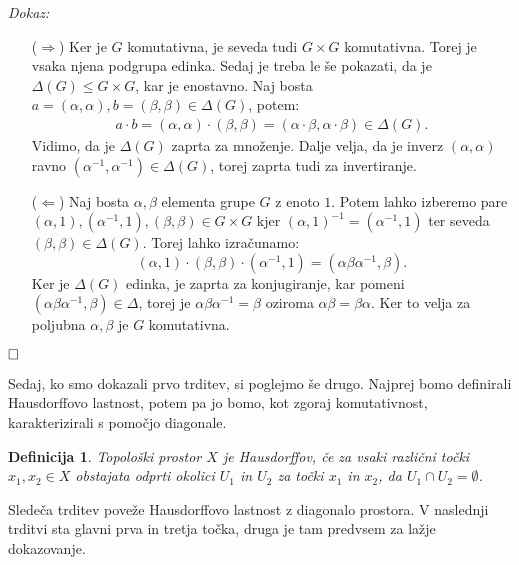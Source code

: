 \documentclass[a4paper,12pt]{article}
\def\qed{$\hfill\Box$}   %
\newtheorem{definicija}{Definicija}
\begin{document}
\noindent
{\em Dokaz:\/}
    \begin{itemize}
        \item[($\Rightarrow$)] Ker je $G$ komutativna, je seveda tudi $G \times G$ komutativna. Torej je vsaka njena podgrupa edinka.
            Sedaj je treba le še pokazati, da je $\Delta(G) \le G \times G$, kar je enostavno. Naj bosta $a = (\alpha, \alpha), b = (\beta, \beta) \in \Delta(G)$, potem:
            \begin{gather*}
                a \cdot b = (\alpha, \alpha) \cdot (\beta, \beta) = (\alpha \cdot \beta, \alpha \cdot \beta) \in \Delta(G).
            \end{gather*}
            Vidimo, da je $\Delta(G)$ zaprta za množenje. Dalje velja, da je inverz $(\alpha, \alpha)$ ravno $(\alpha^{-1}, \alpha^{-1}) \in \Delta(G)$, torej zaprta tudi za invertiranje.
        \item[($\Leftarrow$)] Naj bosta $\alpha, \beta$ elementa grupe $G$ z enoto $1$.
            Potem lahko izberemo pare $(\alpha,1), (\alpha^{-1}, 1), (\beta, \beta) \in G \times G$ kjer
            $(\alpha,1)^{-1} = (\alpha^{-1},1)$ ter seveda $(\beta, \beta) \in \Delta(G)$. Torej lahko izračunamo:
            \[(\alpha,1) \cdot (\beta, \beta) \cdot (\alpha^{-1}, 1) = (\alpha\beta\alpha^{-1}, \beta).\]
            Ker je $\Delta(G)$ edinka, je zaprta za konjugiranje, kar pomeni $(\alpha\beta\alpha^{-1}, \beta) \in \Delta$,
            torej je $\alpha\beta\alpha^{-1} = \beta$ oziroma $\alpha\beta = \beta\alpha$. Ker to velja za poljubna $\alpha, \beta$ je $G$ komutativna.
    \end{itemize}
\qed


Sedaj, ko smo dokazali prvo trditev, si poglejmo še drugo. Najprej bomo definirali Hausdorffovo lastnost, potem pa jo bomo, kot zgoraj komutativnost, karakterizirali s pomočjo diagonale. 

\begin{definicija}
    Topološki prostor $X$ je \emph{Hausdorffov}, če za vsaki različni točki $x_1, x_2 \in X$ obstajata odprti okolici $U_1$ in $U_2$ za točki $x_1$ in $x_2$, da $U_1 \cap U_2 = \emptyset$.
\end{definicija}

Sledeča trditev poveže Hausdorffovo lastnost z diagonalo prostora.
V naslednji trditvi sta glavni prva in tretja točka, druga je tam predvsem za lažje dokazovanje.
\end{document}
